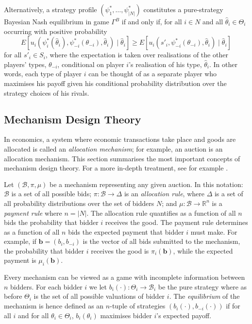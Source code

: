 Alternatively, a strategy profile $(\psi_1^*,\ldots,\psi_{|N|}^*)$ constitutes a pure-strategy Bayesian Nash equilibrium in game $\Gamma^B$ if and only if, for all $i\in N$ and all $\hat{\theta}_i\in\Theta_i$ occurring with positive probability
\begin{equation}
	\label{eq:prop_bayesian_nash_eq_notation}
	E[u_i(\psi^*_i(\hat{\theta}_i),\psi^*_{-i}(\theta_{-i}),\hat{\theta}_i)\mid\hat{\theta}_i] \ge
	E[u_i(s'_i,\psi^*_{-i}(\theta_{-i}),\hat{\theta}_i)\mid\hat{\theta}_i]
\end{equation}
for all $s'_i\in S_i$, where the expectation is taken over realisations of the other players' types, $\theta_{-i}$, conditional on player $i$'s realisation of his type, $\hat{\theta}_i$. In other words, each type of player $i$ can be thought of as a separate player who maximises his payoff given his conditional probability distribution over the strategy choices of his rivals.

\subsection{Mechanism Design Theory} %
\label{sub:mechanism_design_theory_notation}
In economics, a system where economic transactions take place and goods are allocated is called an \emph{allocation mechanism}; for example, an auction is an allocation mechanism. This section summarises the most important concepts of mechanism design theory. For a more in-depth treatment, see for example \cite{MechDesign07,Krishna10,HarrisRaviv1981,HarrisTownsend1975,Myerson1979,Myerson1981}.

Let $(\mathcal{B},\pi,\mu)$ be a mechanism representing any given auction. In this notation: $\mathcal{B}$ is a set of all possible bids; $\pi: \mathcal{B}\to \Delta$ is an \emph{allocation rule}, where $\Delta$ is a set of all probability distributions over the set of bidders $N$; and $\mu:\mathcal{B}\to\mathbb{R}^n$ is a \emph{payment rule} where $n = |N|$. The allocation rule quantifies as a function of all $n$ bids the probability that bidder $i$ receives the good. The payment rule determines as a function of all $n$ bids the expected payment that bidder $i$ must make. For example, if $\mathbf{b}=(b_i,b_{-i})$ is the vector of all bids submitted to the mechanism, the probability that bidder $i$ receives the good is $\pi_i(\mathbf{b})$, while the expected payment is $\mu_i(\mathbf{b})$.

Every mechanism can be viewed as a game with incomplete information between $n$ bidders. For each bidder $i$ we let $b_i(\cdot): \Theta_i \to\mathcal{B}_i$ be the pure strategy where as before $\Theta_i$ is the set of all possible valuations of bidder $i$. The \emph{equilibrium} of the mechanism is hence defined as an $n$-tuple of strategies $(b_i(\cdot),b_{-i}(\cdot))$ if for all $i$ and for all $\theta_i\in\Theta_i$, $b_i(\theta_i)$ maximises bidder $i$'s expected payoff.

